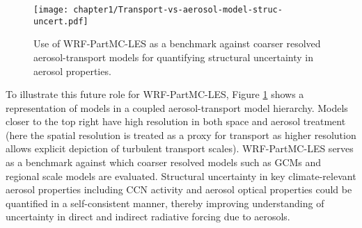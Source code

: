 \begin{figure}[!t]
	\centering
	\texttt{[image: chapter1/Transport-vs-aerosol-model-struc-uncert.pdf]}
	\caption{Use of WRF-PartMC-LES as a benchmark against coarser resolved aerosol-transport models for quantifying structural uncertainty in aerosol properties.}
	\label{fig:transport-vs-aerosol-model}
\end{figure} 

To illustrate this future role for WRF-PartMC-LES, Figure \ref{fig:transport-vs-aerosol-model} shows a representation of models in a coupled aerosol-transport model hierarchy. Models closer to the top right have high resolution in both space and aerosol treatment (here the spatial resolution is treated as a proxy for transport as higher resolution allows explicit depiction of turbulent transport scales). WRF-PartMC-LES serves as a benchmark against which coarser resolved models such as GCMs and regional scale models are evaluated. Structural uncertainty in key climate-relevant aerosol properties including CCN activity and aerosol optical properties could be quantified in a self-consistent manner, thereby improving understanding of uncertainty in direct and indirect radiative forcing due to aerosols.   


